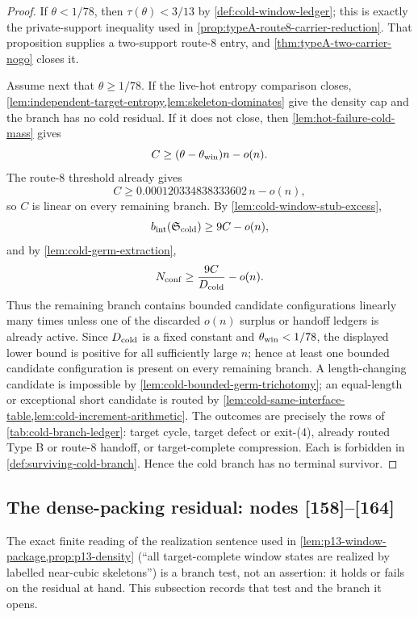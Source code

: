 \documentclass[11pt]{article}
\begin{document}
\begin{proof}
If \(\theta<1/78\), then
\(\tau(\theta)<3/13\) by \cref{def:cold-window-ledger}; this is exactly the
private-support inequality used in
\cref{prop:typeA-route8-carrier-reduction}.  That proposition supplies a
two-support route-8 entry, and \cref{thm:typeA-two-carrier-nogo} closes it.

Assume next that \(\theta\ge1/78\).  If the live-hot entropy comparison closes,
\cref{lem:independent-target-entropy,lem:skeleton-dominates} give the density
cap and the branch has no cold residual.  If it does not close, then
\cref{lem:hot-failure-cold-mass} gives
\[
C\ge(\theta-\theta_{\rm win})n-o(n).
\]
The route-8 threshold already gives
\[
C\ge0.000120334838333602\,n-o(n),
\]
so \(C\) is linear on every remaining branch.  By
\cref{lem:cold-window-stub-excess},
\[
b_{\rm int}(\mathfrak S_{\rm cold})\ge9C-o(n),
\]
and by \cref{lem:cold-germ-extraction},
\[
N_{\rm conf}\ge\frac{9C}{D_{\rm cold}}-o(n).
\]
Thus the remaining branch contains bounded candidate configurations linearly many times
unless one of the discarded \(o(n)\) surplus or handoff ledgers is already
active.  Since \(D_{\rm cold}\) is a fixed constant and
\(\theta_{\rm win}<1/78\), the displayed lower bound is positive for all
sufficiently large \(n\); hence at least one bounded candidate configuration is present
on every remaining branch.  A length-changing candidate is impossible by
\cref{lem:cold-bounded-germ-trichotomy}; an equal-length or exceptional short
candidate is routed by
\cref{lem:cold-same-interface-table,lem:cold-increment-arithmetic}.
The outcomes are precisely the rows of \cref{tab:cold-branch-ledger}: target
cycle, target defect or exit-\textup{(4)}, already routed Type B or route-8
handoff, or target-complete compression.  Each is forbidden in
\cref{def:surviving-cold-branch}.  Hence the cold branch has no terminal
survivor.
\end{proof}

\subsection{The dense-packing residual: nodes [158]--[164]}

The exact finite reading of the realization sentence used in
\cref{lem:p13-window-package,prop:p13-density} (``all target-complete window
states are realized by labelled near-cubic skeletons'') is a branch test, not
an assertion: it holds or fails on the residual at hand.  This subsection
records that test and the branch it opens.
\end{document}
